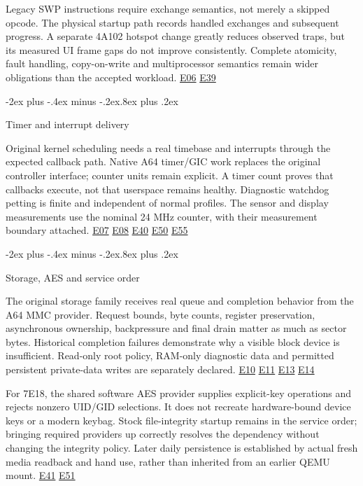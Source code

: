 \documentclass[10pt,letterpaper,twocolumn]{article}
\makeatletter
\renewcommand{\subsection}{\@startsection{subsection}{2}{0pt}
  {-2ex plus -.4ex minus -.2ex}{.8ex plus .2ex}
  {\normalfont\normalsize\bfseries\raggedright}}
\makeatother
\begin{document}
Legacy SWP instructions require exchange semantics, not merely a skipped opcode. The physical startup path records handled exchanges and subsequent progress. A separate 4A102 hotspot change greatly reduces observed traps, but its measured UI frame gaps do not improve consistently. Complete atomicity, fault handling, copy-on-write and multiprocessor semantics remain wider obligations than the accepted workload. \hyperlink{e-E06}{\textsf{E06}} \hyperlink{e-E39}{\textsf{E39}}

\subsection{Timer and interrupt delivery}

Original kernel scheduling needs a real timebase and interrupts through the expected callback path. Native A64 timer/GIC work replaces the original controller interface; counter units remain explicit. A timer count proves that callbacks execute, not that userspace remains healthy. Diagnostic watchdog petting is finite and independent of normal profiles. The sensor and display measurements use the nominal 24 MHz counter, with their measurement boundary attached. \hyperlink{e-E07}{\textsf{E07}} \hyperlink{e-E08}{\textsf{E08}} \hyperlink{e-E40}{\textsf{E40}} \hyperlink{e-E50}{\textsf{E50}} \hyperlink{e-E55}{\textsf{E55}}

\subsection{Storage, AES and service order}

The original storage family receives real queue and completion behavior from the A64 MMC provider. Request bounds, byte counts, register preservation, asynchronous ownership, backpressure and final drain matter as much as sector bytes. Historical completion failures demonstrate why a visible block device is insufficient. Read-only root policy, RAM-only diagnostic data and permitted persistent private-data writes are separately declared. \hyperlink{e-E10}{\textsf{E10}} \hyperlink{e-E11}{\textsf{E11}} \hyperlink{e-E13}{\textsf{E13}} \hyperlink{e-E14}{\textsf{E14}}

For 7E18, the shared software AES provider supplies explicit-key operations and rejects nonzero UID/GID selections. It does not recreate hardware-bound device keys or a modern keybag. Stock file-integrity startup remains in the service order; bringing required providers up correctly resolves the dependency without changing the integrity policy. Later daily persistence is established by actual fresh media readback and hand use, rather than inherited from an earlier QEMU mount. \hyperlink{e-E41}{\textsf{E41}} \hyperlink{e-E51}{\textsf{E51}}
\end{document}
